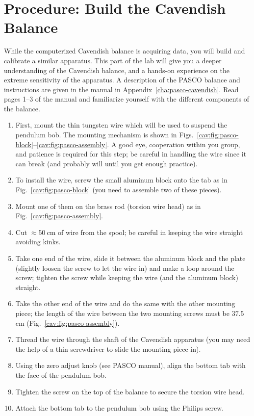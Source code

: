 \section{Procedure: Build the Cavendish Balance}

While the computerized Cavendish balance is acquiring data, you will build and calibrate
a similar apparatus. This part of the lab will give you a deeper understanding of the
Cavendish balance, and a hands-on experience on the extreme sensitivity of the
apparatus. A description of the PASCO balance and instructions are given in the manual in Appendix~\ref{cha:pasco-cavendish}.
Read pages 1--3 of the manual and familiarize yourself with the different components of
the balance.

\begin{enumerate}
	\item First, mount the thin tungsten wire which will be used to suspend the
	pendulum bob. The mounting mechanism is shown in Figs.~\ref{cav:fig:pasco-block}--\ref{cav:fig:pasco-assembly}. A good eye,
	cooperation within you group, and patience is required for this step; be careful in
	handling the wire since it can break (and probably will until you get enough
	practice).
	
	\item To install the wire, screw the small aluminum block onto the tab as in Fig.~\ref{cav:fig:pasco-block} (you
	need to assemble two of these pieces).
	
	\item Mount one of them on the brass rod (torsion wire head) as in Fig.~\ref{cav:fig:pasco-assembly}.
	
	\item Cut $\approx 50\:$cm of wire from the spool; be careful in keeping the wire straight
	avoiding kinks.
	
	\item Take one end of the wire, slide it between the aluminum block and the plate
	(slightly loosen the screw to let the wire in) and make a loop around the screw;
	tighten the screw while keeping the wire (and the aluminum block) straight.
	
	\item Take the other end of the wire and do the same with the other mounting piece; the
	length of the wire between the two mounting screws must be $37.5\:$cm (Fig.~\ref{cav:fig:pasco-assembly}).
	
	\item Thread the wire through the shaft of the Cavendish apparatus (you may need the
	help of a thin screwdriver to slide the mounting piece in).
	
	\item Using the zero adjust knob (see PASCO manual), align the bottom tab with the
	face of the pendulum bob.
	
	\item Tighten the screw on the top of the balance to secure the torsion wire head.
	
	\item Attach the bottom tab to the pendulum bob using the Philips screw.

\end{enumerate}

